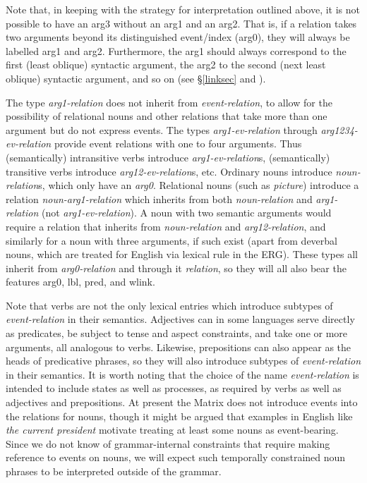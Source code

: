 \documentclass[12pt]{article}
\begin{document}
Note that, in keeping with the strategy for interpretation outlined
above, it is not possible to have an {\sc arg3} without an {\sc arg1}
and an {\sc arg2}.  That is, if a relation takes two arguments 
beyond its distinguished event/index ({\sc arg0}), they will always
be labelled {\sc arg1} and {\sc arg2}.  Furthermore, the {\sc arg1}
should always correspond to the first (least oblique) syntactic
argument, the {\sc arg2} to the second (next least oblique) syntactic
argument, and so on (see \S\ref{linksec} and ).

The type {\it arg1-relation} does not inherit from {\it event-relation}, to
allow for the possibility of relational nouns and other relations that
take more than one argument but do not express events.
The types {\it arg1-ev-relation} through {\it arg1234-ev-relation} provide 
event
relations with one to four arguments.  Thus (semantically)
intransitive verbs introduce {\it arg1-ev-relation}s, (semantically) transitive
verbs introduce {\it arg12-ev-relation}s, etc.  Ordinary nouns introduce {\it
noun-relation}s, which only have an {\it arg0}.  Relational nouns (such as
{\it picture}) introduce a relation {\it noun-arg1-relation} which inherits 
from both {\it noun-relation} and {\it arg1-relation} (not {\it
arg1-ev-relation}).  A noun with two semantic arguments would require a 
relation
that inherits from {\it noun-relation} and {\it arg12-relation}, and similarly
for a noun with three arguments, if such exist (apart from deverbal nouns,
which are treated for English via lexical rule in the ERG).  These types all 
inherit from {\it arg0-relation} and
through it {\it relation}, so they will all also bear the features {\sc
arg0}, {\sc lbl}, {\sc pred}, and {\sc wlink}.

Note that verbs are not the only lexical entries which introduce subtypes of
{\it event-relation} in their semantics.  Adjectives can in some languages 
serve
directly as predicates, be subject to tense and aspect constraints, and take
one or more arguments, all analogous to verbs.  Likewise, prepositions can also
appear as the heads of predicative phrases, so they will also introduce
subtypes of {\it event-relation} in their semantics.  It is worth noting that
the choice of the name {\it event-relation} is intended to include states as 
well
as processes, as required by verbs as well as adjectives and prepositions.
At present the Matrix does not introduce events into the relations for nouns,
though it might be argued that examples in English like {\it the current
president} motivate treating at least some nouns as event-bearing.  Since we
do not know of grammar-internal constraints that require making reference to
events on nouns, we will expect such temporally constrained noun phrases to
be interpreted outside of the grammar.
\end{document}
